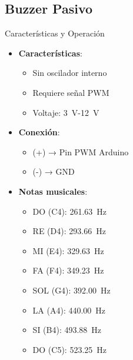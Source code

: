 \subsection{Buzzer Pasivo}
\begin{componentBox}{Características y Operación \citep{arduino_tone}}
	\begin{itemize}[leftmargin=*,itemsep=1pt,parsep=1pt]
		\item \textbf{Características}:
		\begin{itemize}[itemsep=0pt,parsep=0pt]
			\item Sin oscilador interno
			\item Requiere señal PWM
			\item Voltaje: \SI{3}{\volt}-\SI{12}{\volt}
		\end{itemize}
		\item \textbf{Conexión}:
		\begin{itemize}[itemsep=0pt,parsep=0pt]
			\item (+) → Pin PWM Arduino
			\item (-) → GND
		\end{itemize}
		\item \textbf{Notas musicales}:
		\begin{multicols}{2}
			\begin{itemize}[itemsep=0pt,parsep=0pt]
				\item DO (C4): \SI{261.63}{\hertz}
				\item RE (D4): \SI{293.66}{\hertz}
				\item MI (E4): \SI{329.63}{\hertz}
				\item FA (F4): \SI{349.23}{\hertz}
				\item SOL (G4): \SI{392.00}{\hertz}
				\item LA (A4): \SI{440.00}{\hertz}
				\item SI (B4): \SI{493.88}{\hertz}
				\item DO (C5): \SI{523.25}{\hertz}
			\end{itemize}
		\end{multicols}
	\end{itemize}
\end{componentBox}


